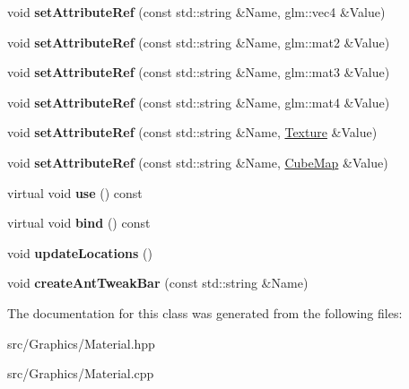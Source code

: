 \begin{DoxyCompactItemize}
\item 
\hypertarget{class_material_a68fd8ab113ed421b3f6d8abe40b799ad}{void {\bfseries set\+Attribute\+Ref} (const std\+::string \&Name, glm\+::vec4 \&Value)}\label{class_material_a68fd8ab113ed421b3f6d8abe40b799ad}

\item 
\hypertarget{class_material_af1a490b5d19e34f06c5f92b0a071b44f}{void {\bfseries set\+Attribute\+Ref} (const std\+::string \&Name, glm\+::mat2 \&Value)}\label{class_material_af1a490b5d19e34f06c5f92b0a071b44f}

\item 
\hypertarget{class_material_ae13cfa6e0b28ce184de529f2a5afeadd}{void {\bfseries set\+Attribute\+Ref} (const std\+::string \&Name, glm\+::mat3 \&Value)}\label{class_material_ae13cfa6e0b28ce184de529f2a5afeadd}

\item 
\hypertarget{class_material_ab53e7f93f9e17353a4824f789f3fbce2}{void {\bfseries set\+Attribute\+Ref} (const std\+::string \&Name, glm\+::mat4 \&Value)}\label{class_material_ab53e7f93f9e17353a4824f789f3fbce2}

\item 
\hypertarget{class_material_aa7f8d790d2030b4d2580163b6aa49b74}{void {\bfseries set\+Attribute\+Ref} (const std\+::string \&Name, \hyperlink{class_texture}{Texture} \&Value)}\label{class_material_aa7f8d790d2030b4d2580163b6aa49b74}

\item 
\hypertarget{class_material_ae0c9b60619e3c19163ec8e570635e113}{void {\bfseries set\+Attribute\+Ref} (const std\+::string \&Name, \hyperlink{class_cube_map}{Cube\+Map} \&Value)}\label{class_material_ae0c9b60619e3c19163ec8e570635e113}

\item 
\hypertarget{class_material_a65d2c413d6f1784ecdb9a41eec3b7793}{virtual void {\bfseries use} () const }\label{class_material_a65d2c413d6f1784ecdb9a41eec3b7793}

\item 
\hypertarget{class_material_ac51038992e159bb1ed702d5328bbc12a}{virtual void {\bfseries bind} () const }\label{class_material_ac51038992e159bb1ed702d5328bbc12a}

\item 
\hypertarget{class_material_a1a93e19733a4c0b40c2d9e87fc091b17}{void {\bfseries update\+Locations} ()}\label{class_material_a1a93e19733a4c0b40c2d9e87fc091b17}

\item 
\hypertarget{class_material_a9a1fd75078ce50d3921b7027f37e96b2}{void {\bfseries create\+Ant\+Tweak\+Bar} (const std\+::string \&Name)}\label{class_material_a9a1fd75078ce50d3921b7027f37e96b2}

\end{DoxyCompactItemize}


The documentation for this class was generated from the following files\+:\begin{DoxyCompactItemize}
\item 
src/\+Graphics/Material.\+hpp\item 
src/\+Graphics/Material.\+cpp\end{DoxyCompactItemize}
